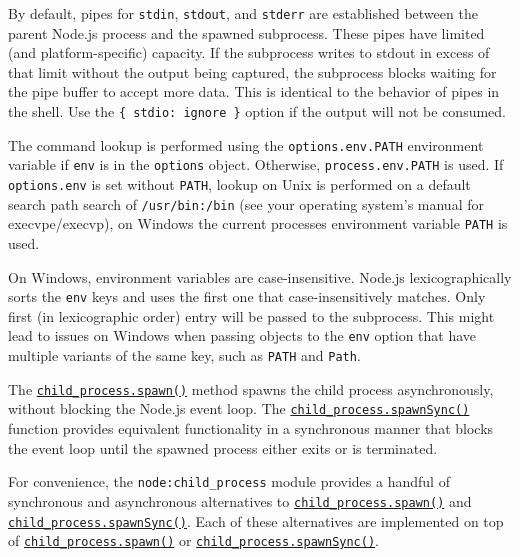 By default, pipes for \texttt{stdin}, \texttt{stdout}, and
\texttt{stderr} are established between the parent Node.js process and
the spawned subprocess. These pipes have limited (and platform-specific)
capacity. If the subprocess writes to stdout in excess of that limit
without the output being captured, the subprocess blocks waiting for the
pipe buffer to accept more data. This is identical to the behavior of
pipes in the shell. Use the
\texttt{\{\ stdio:\ \textquotesingle{}ignore\textquotesingle{}\ \}}
option if the output will not be consumed.

The command lookup is performed using the \texttt{options.env.PATH}
environment variable if \texttt{env} is in the \texttt{options} object.
Otherwise, \texttt{process.env.PATH} is used. If \texttt{options.env} is
set without \texttt{PATH}, lookup on Unix is performed on a default
search path search of \texttt{/usr/bin:/bin} (see your operating
system's manual for execvpe/execvp), on Windows the current processes
environment variable \texttt{PATH} is used.

On Windows, environment variables are case-insensitive. Node.js
lexicographically sorts the \texttt{env} keys and uses the first one
that case-insensitively matches. Only first (in lexicographic order)
entry will be passed to the subprocess. This might lead to issues on
Windows when passing objects to the \texttt{env} option that have
multiple variants of the same key, such as \texttt{PATH} and
\texttt{Path}.

The
\hyperref[child_processspawncommand-args-options]{\texttt{child\_process.spawn()}}
method spawns the child process asynchronously, without blocking the
Node.js event loop. The
\hyperref[child_processspawnsynccommand-args-options]{\texttt{child\_process.spawnSync()}}
function provides equivalent functionality in a synchronous manner that
blocks the event loop until the spawned process either exits or is
terminated.

For convenience, the \texttt{node:child\_process} module provides a
handful of synchronous and asynchronous alternatives to
\hyperref[child_processspawncommand-args-options]{\texttt{child\_process.spawn()}}
and
\hyperref[child_processspawnsynccommand-args-options]{\texttt{child\_process.spawnSync()}}.
Each of these alternatives are implemented on top of
\hyperref[child_processspawncommand-args-options]{\texttt{child\_process.spawn()}}
or
\hyperref[child_processspawnsynccommand-args-options]{\texttt{child\_process.spawnSync()}}.

